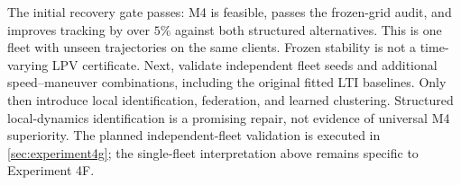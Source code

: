 The initial recovery gate passes: M4 is feasible, passes the frozen-grid audit,
and improves tracking by over $5\%$ against both structured alternatives.
This is one fleet with unseen trajectories on the same clients. Frozen
stability is not a time-varying LPV certificate. Next, validate independent
fleet seeds and additional speed--maneuver combinations, including the original
fitted LTI baselines. Only then introduce local identification, federation, and
learned clustering. Structured local-dynamics identification is a promising
repair, not evidence of universal M4 superiority.
The planned independent-fleet validation is executed in
\cref{sec:experiment4g}; the single-fleet interpretation above remains specific
to Experiment 4F.
